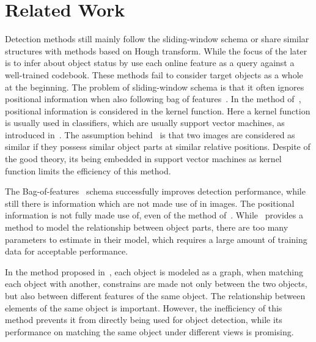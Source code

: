 \documentclass[paper]{ieice}
\begin{document}
\section{Related Work}
\label{rw5}


Detection methods still mainly follow the sliding-window schema or share similar structures with methods based on Hough transform. While the focus of the later is to infer about object status by use each online feature as a query against a well-trained codebook. These methods fail to consider target objects as a whole at the beginning. The problem of sliding-window schema is that it often ignores positional information when also following bag of features~\cite{bgf}. In the method of~\cite{spmk}, positional information is considered in the kernel function. Here a kernel function is usually used in classifiers, which are usually support vector machines, as introduced in~\cite{kmts}. The assumption behind~\cite{spmk} is that two images are considered as similar if they possess similar object parts at similar relative positions. Despite of the good theory, its being embedded in support vector machines as kernel function limits the efficiency of this method.


The Bag-of-features~\cite{bgf} schema successfully improves detection performance, while still there is information which are not made use of in images. The positional information is not fully made use of, even of the method of~\cite{kmts}. While~\cite{ac3} provides a method to model the relationship between object parts, there are too many parameters to estimate in their model, which requires a large amount of training data for acceptable performance.

In the method proposed in~\cite{ac222}, each object is modeled as a graph, when matching each object with another, constrains are made not only between the two objects, but also between different features of the same object. The relationship between elements of the same object is important. However, the inefficiency of this method prevents it from directly being used for object detection, while its performance on matching the same object under different views is promising.
\end{document}
